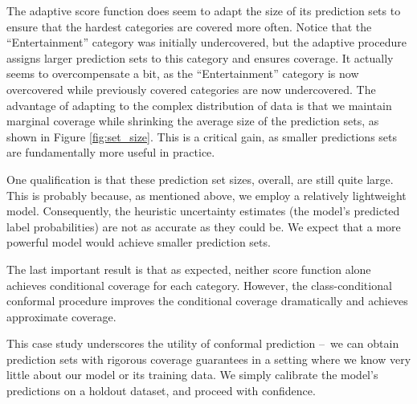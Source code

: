 \documentclass[a4paper, 12pt]{article}
\begin{document}
The adaptive score function does seem to adapt the size of its prediction sets to ensure that the hardest categories are covered more often. Notice that the ``Entertainment'' category was initially undercovered, but the adaptive procedure assigns larger prediction sets to this category and ensures coverage. It actually seems to overcompensate a bit, as the ``Entertainment'' category is now overcovered while previously covered categories are now undercovered. The advantage of adapting to the complex distribution of data is that we maintain marginal coverage while shrinking the average size of the prediction sets, as shown in Figure \ref{fig:set_size}. This is a critical gain, as smaller predictions sets are fundamentally more useful in practice.

One qualification is that these prediction set sizes, overall, are still quite large. This is probably because, as mentioned above, we employ a relatively lightweight model. Consequently, the heuristic uncertainty estimates (the model's predicted label probabilities) are not as accurate as they could be. We expect that a more powerful model would achieve smaller prediction sets.

The last important result is that as expected, neither score function alone achieves conditional coverage for each category. However, the class-conditional conformal procedure improves the conditional coverage dramatically and achieves approximate coverage.

This case study underscores the utility of conformal prediction --\ we can obtain prediction sets with rigorous coverage guarantees in a setting where we know very little about our model or its training data. We simply calibrate the model's predictions on a holdout dataset, and proceed with confidence.
\end{document}
